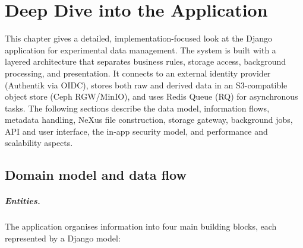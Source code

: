\chapter{Deep Dive into the Application}\label{chap:deep-dive-app}

This chapter gives a detailed, implementation-focused look at the Django application for experimental data management. 
The system is built with a layered architecture that separates business rules, storage access, background processing, and presentation. 
It connects to an external identity provider (Authentik via OIDC), stores both raw and derived data in an S3-compatible object store (Ceph RGW/MinIO), 
and uses Redis Queue (RQ) for asynchronous tasks.
The following sections describe the data model, information flows, metadata handling, NeXus file construction, storage gateway, 
background jobs, API and user interface, the in-app security model, and performance and scalability aspects.


\section{Domain model and data flow}\label{sec:domain-dataflow}

\paragraph{Entities.}
The application organises information into four main building blocks, each represented by a Django model:

